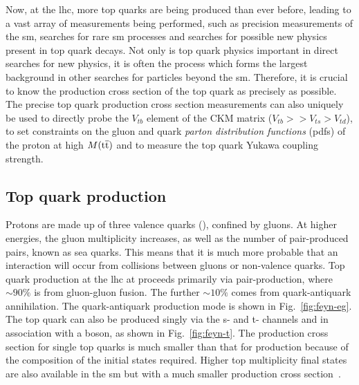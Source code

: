 Now, at the \acrshort{lhc}, more top quarks are being produced than ever before, leading to a vast array of measurements being performed, such as precision measurements of the \acrshort{sm}, searches for rare \acrshort{sm} processes and searches for possible new physics present in top quark decays.
Not only is top quark physics important in direct searches for new physics, it is often the process which forms the largest background in other searches for particles beyond the \acrshort{sm}.
Therefore, it is crucial to know the production cross section of the top quark as precisely as possible.
The precise top quark production cross section measurements can also uniquely be used to directly probe the $V_{tb}$ element of the CKM matrix ($V_{tb} >> V_{ts} > V_{td}$), to set constraints on the gluon and quark \textit{parton distribution functions} (\acrshort{pdf}s) of the proton at high $M(\mathrm{t}\overline{\mathrm{t}})$ and to measure the top quark Yukawa coupling strength.

\subsection{Top quark production} %
\label{sub:top_quark_production}

Protons are made up of three valence quarks (\uquark{}\uquark{}\dquark{}), confined by gluons. 
At higher energies, the gluon multiplicity increases, as well as the number of pair-produced \qqbar{} pairs, known as sea quarks.
This means that it is much more probable that an interaction will occur from collisions between gluons or non-valence quarks.
Top quark production at the \acrshort{lhc} at \com{} proceeds primarily via \ttbar{} pair-production, where $\sim90\%$ is from gluon-gluon fusion. 
The further $\sim10\%$ comes from quark-antiquark annihilation.
The quark-antiquark production mode is shown in Fig.~\ref{fig:feyn-eg}. 
The top quark can also be produced singly via the s- and t- channels and in association with a \Wboson{} boson, as shown in Fig.~\ref{fig:feyn-t}.
The production cross section for single top quarks is much smaller than that for \ttbar{} production because of the composition of the initial states required.
Higher top multiplicity final states are also available in the \acrshort{sm} but with a much smaller production cross section~\cite{Gen:MGamc}.

% 

